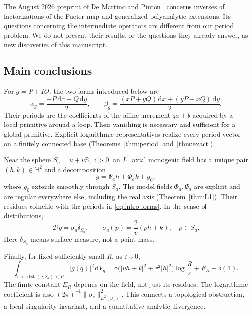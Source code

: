 \documentclass[11pt,a4paper]{article}
\numberwithin{equation}{section}
\theoremstyle{definition}
\theoremstyle{remark}
\newcommand{\HH}{\mathbb H}
\newcommand{\SSS}{\mathbb S}
\newcommand{\D}{\mathcal D}
\newcommand{\dd}{\,\mathrm d}
\newcommand{\dist}{\operatorname{dist}}
\newcommand{\norm}[1]{\lVert#1\rVert}
\begin{document}
The August 2026 preprint of De Martino and Pinton~\cite{DMP} concerns inverses
of factorizations of the Fueter map and generalized polyanalytic extensions.
Its questions concerning the intermediate operators are different from our
period problem. We do not present their results, or the questions they
already answer, as new discoveries of this manuscript.

\subsection{Main conclusions}
For $g=P+IQ$, the two forms introduced below are
\begin{equation}\label{eq:intro-forms}
 \alpha_g=\frac{-P\dd x+Q\dd y}{2},\qquad
 \beta_g=\frac{(xP+yQ)\dd x+(yP-xQ)\dd y}{2}.
\end{equation}
Their periods are the coefficients of the affine increment $qa+b$ acquired
by a local primitive around a loop. Their vanishing is necessary and
sufficient for a global primitive. Explicit logarithmic representatives
realize every period vector on a finitely connected base
(Theorems~\ref{thm:period} and~\ref{thm:exact}).

Near the sphere $S_a=u+v\SSS$, $v>0$, an $L^1$ axial monogenic field has a
unique pair $(h,k)\in\HH^2$ and a decomposition
\begin{equation}\label{eq:intro-decomp}
 g=\Psi_a h+\Phi_a k+g_0,
\end{equation}
where $g_0$ extends smoothly through $S_a$. The model fields $\Phi_a,\Psi_a$
are explicit and are regular everywhere else, including the real axis
(Theorem~\ref{thm:L1}). Their residues coincide with the periods in
\eqref{eq:intro-forms}. In the sense of distributions,
\begin{equation}\label{eq:intro-source}
 \D g=\sigma_a\delta_{S_a},\qquad
 \sigma_a(p)=\frac{2}{v}(ph+k),\quad p\in S_a.
\end{equation}
Here $\delta_{S_a}$ means surface measure, not a point mass.

Finally, for fixed sufficiently small $R$, as $\varepsilon\downarrow0$,
\begin{equation}\label{eq:intro-energy}
 \int_{\varepsilon<\dist(q,S_a)<R}|g(q)|^2\dd V_q
 =8\bigl(|uh+k|^2+v^2|h|^2\bigr)
       \log\frac{R}{\varepsilon}+E_R+o(1).
\end{equation}
The finite constant $E_R$ depends on the field, not just its residues.
The logarithmic coefficient is also
$(2\pi)^{-1}\norm{\sigma_a}_{L^2(S_a)}^2$.
This connects a topological obstruction, a local singularity invariant,
and a quantitative analytic divergence.
\end{document}
